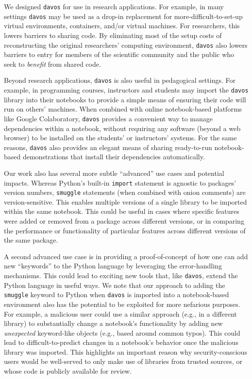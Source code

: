 \documentclass[preprint,12pt, a4paper]{elsarticle}
\begin{document}
We designed \texttt{davos} for use in research applications.  For
example, in many settings \texttt{davos} may be used as a drop-in
replacement for more-difficult-to-set-up virtual environments,
containers, and/or virtual machines.  For researchers, this lowers
barriers to sharing code.  By eliminating most of the setup costs
of reconstructing the original researchers' computing environment,
\texttt{davos} also lowers barriers to entry for members of
the scientific community and the public who seek to \textit{benefit}
from shared code.

Beyond research applications, \texttt{davos} is also useful in
pedagogical settings.  For example, in programming courses,
instructors and students may import the \texttt{davos} library into
their notebooks to provide a simple means of ensuring their code will
run on others' machines.  When combined with online notebook-based
platforms like Google Colaboratory, \texttt{davos} provides a
convenient way to manage dependencies within a notebook, without
requiring any software (beyond a web browser) to be installed on the
students' or instructors' systems.  For the same reasons,
\texttt{davos} also provides an elegant means of sharing ready-to-run
notebook-based demonstrations that install their dependencies
automatically.

Our work also has several more subtle ``advanced'' use cases and
potential impacts.  Whereas Python's built-in \texttt{import}
statement is agnostic to packages' version numbers, \texttt{smuggle}
statements (when combined with onion comments) are version-sensitive.
This enables multiple versions of a single library to be
imported within the same notebook.  This could be useful in cases
where specific features were added or removed from a package across
different versions, or in comparing the performance or functionality
of particular features across different versions of the same package.

A second advanced use case is in providing a proof-of-concept of how
one can add new ``keywords'' to the Python language by leveraging the
error-handling mechanisms.  This could lead to exciting new tools
that, like \texttt{davos}, extend the Python language in useful ways.
We note that our approach to adding the \texttt{smuggle} keyword to
Python when \texttt{davos} is imported into a notebook-based
environment also has the potential to be exploited for more nefarious
purposes.  For example, a malicious user could use a similar approach
(e.g., in a different library) to substantially change a notebook's
functionality by adding new \textit{unexpected} keyword-like objects
(e.g., based around common typos).  This could lead to
difficult-to-predict changes in a notebook's behavior once the
malicious library was imported.  This highlights an important reason
why security-conscious users would be well-served to only make use of
libraries from trusted sources, or whose code is publicly available
for review.
\end{document}
